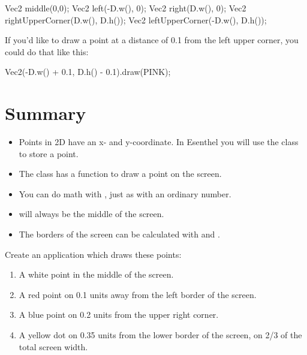 \begin{code}
Vec2 middle(0,0);
Vec2 left(-D.w(), 0);
Vec2 right(D.w(), 0);
Vec2 rightUpperCorner(D.w(), D.h());
Vec2 leftUpperCorner(-D.w(), D.h());
\end{code}

If you'd like to draw a point at a distance of 0.1 from the left upper corner, you could do that like this:

\begin{code}
Vec2(-D.w() + 0.1, D.h() - 0.1).draw(PINK);
\end{code}

\section{Summary}
\begin{itemize}
\item Points in 2D have an x- and y-coordinate. In Esenthel you will use the class  to store a point.
\item The class  has a function  to draw a point on the screen.
\item You can do math with , just as with an ordinary number.
\item {} will always be the middle of the screen.
\item The borders of the screen can be calculated with  and .
\end{itemize}

\begin{exercise}
Create an application which draws these points:
\begin{enumerate}
	\item A white point in the middle of the screen.
	\item A red point on 0.1 units away from the left border of the screen.
	\item A blue point on 0.2 units from the upper right corner.
	\item A yellow dot on 0.35 units from the lower border of the screen, on 2/3 of the total screen width.
\end{enumerate}
\end{exercise}

